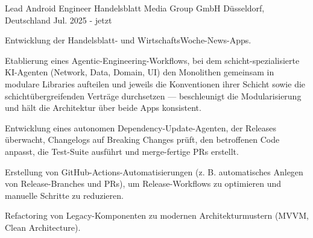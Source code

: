 

\hypersetup{urlcolor=linkblue, linkcolor=linkblue, citecolor=linkblue}

\begin{cventries}

\cventry
    {Lead Android Engineer} %
    {Handelsblatt Media Group GmbH} %
    {Düsseldorf, Deutschland} %
    {Jul. 2025 - jetzt} %
    {
      \begin{cvitems} %
        \item {Entwicklung der Handelsblatt- und WirtschaftsWoche-News-Apps.}
        \item {Etablierung eines Agentic-Engineering-Workflows, bei dem schicht-spezialisierte KI-Agenten (Network, Data, Domain, UI) den Monolithen gemeinsam in modulare Libraries aufteilen und jeweils die Konventionen ihrer Schicht sowie die schichtübergreifenden Verträge durchsetzen --- beschleunigt die Modularisierung und hält die Architektur über beide Apps konsistent.}
        \item {Entwicklung eines autonomen Dependency-Update-Agenten, der Releases überwacht, Changelogs auf Breaking Changes prüft, den betroffenen Code anpasst, die Test-Suite ausführt und merge-fertige PRs erstellt.}
        \item {Erstellung von GitHub-Actions-Automatisierungen (z. B. automatisches Anlegen von Release-Branches und PRs), um Release-Workflows zu optimieren und manuelle Schritte zu reduzieren.}
        \item {Refactoring von Legacy-Komponenten zu modernen Architekturmustern (MVVM, Clean Architecture).}
      \end{cvitems}
    }


\end{cventries}
